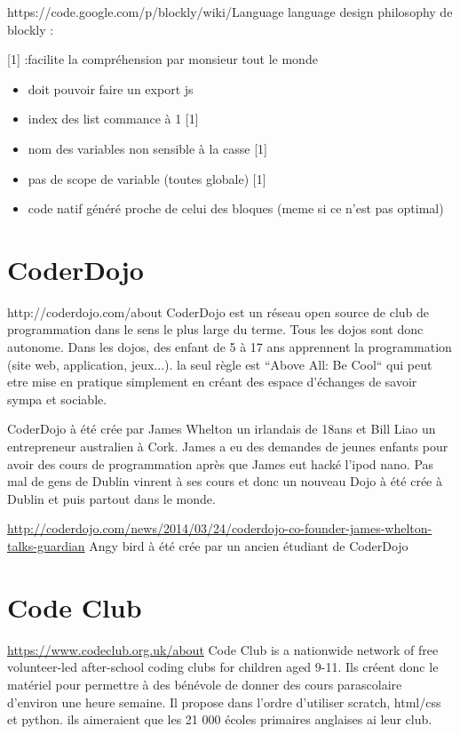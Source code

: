 https://code.google.com/p/blockly/wiki/Language
language design philosophy de blockly :

[1] :facilite la compréhension par monsieur tout le monde
\begin{itemize}
  \item doit pouvoir faire un export js
  \item index des list commance à 1 [1]
  \item nom des variables non sensible à la casse [1]
  \item pas de scope de variable (toutes globale) [1]
  \item code natif généré proche de celui des bloques (meme si ce n'est pas optimal)
\end{itemize}

\section{CoderDojo}
http://coderdojo.com/about
CoderDojo est un réseau open source de club de programmation dans le sens le plus large du terme. Tous les dojos sont donc autonome.  Dans les dojos, des enfant de 5 à 17 ans apprennent la programmation (site web, application, jeux...). la seul règle est  “Above All: Be Cool“ qui peut etre mise en pratique simplement en créant des espace d'échanges de savoir sympa et sociable.

CoderDojo à été crée par James Whelton un irlandais de 18ans et Bill Liao un entrepreneur australien à Cork. James a eu des demandes de jeunes enfants pour avoir des cours de programmation après que James eut hacké l'ipod nano. Pas mal de gens de Dublin vinrent à ses cours et donc un nouveau Dojo à été crée à Dublin et puis partout dans le monde.

\url{http://coderdojo.com/news/2014/03/24/coderdojo-co-founder-james-whelton-talks-guardian}
Angy bird à été crée par un ancien étudiant de CoderDojo

\section{Code Club}
\url{https://www.codeclub.org.uk/about}
Code Club is a nationwide network of free volunteer-led after-school coding clubs for children aged 9-11.
Ils créent donc le matériel pour permettre à des bénévole de donner des cours parascolaire d'environ une heure semaine. Il propose dans l'ordre d'utiliser scratch, html/css et python. ils aimeraient que les 21 000 écoles primaires anglaises ai leur club.

